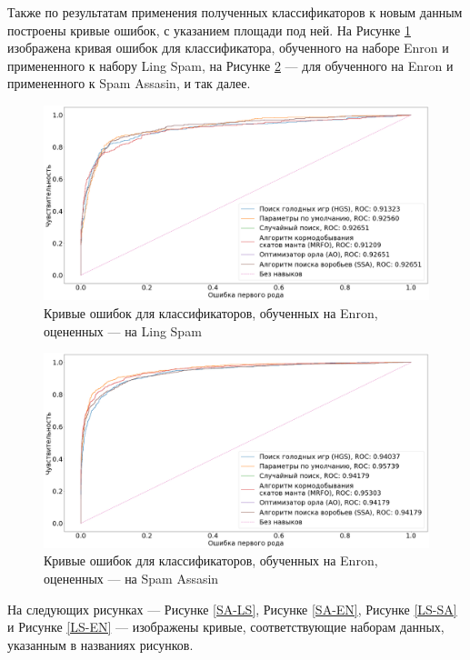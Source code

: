 Также по результатам применения полученных классификаторов к новым данным построены кривые ошибок, с указанием 
площади под ней. На Рисунке \ref{EN-LS} изображена кривая ошибок для классификатора, обученного на наборе Enron и 
примененного к набору Ling Spam, на Рисунке \ref{EN-SA} — для обученного на Enron и примененного к Spam Assasin, и 
так далее.

\begin{figure}[H]
    \centering
    \includegraphics[width=165mm]{static/EN-LS.png}
    \caption{Кривые ошибок для классификаторов, обученных на Enron, оцененных — на Ling Spam}
    \label{EN-LS}
\end{figure}

\begin{figure}[H]
    \centering
    \includegraphics[width=165mm]{static/EN-SA.png}
    \caption{Кривые ошибок для классификаторов, обученных на Enron, оцененных — на Spam Assasin}
    \label{EN-SA}
\end{figure}

На следующих рисунках — Рисунке \ref{SA-LS}, Рисунке \ref{SA-EN}, Рисунке \ref{LS-SA} и Рисунке \ref{LS-EN} — 
изображены кривые, соответствующие наборам данных, указанным в названиях рисунков.

